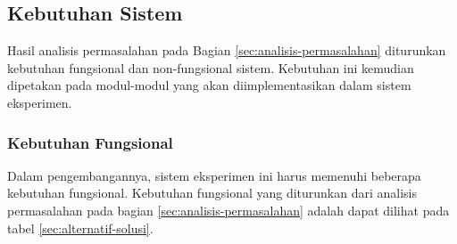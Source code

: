 \subsection{Kebutuhan Sistem}
\label{subsection:system-requirements}

Hasil analisis permasalahan pada Bagian \ref{sec:analisis-permasalahan} diturunkan kebutuhan fungsional dan non-fungsional sistem. Kebutuhan ini kemudian dipetakan pada modul-modul yang akan diimplementasikan dalam sistem eksperimen.

\subsubsection{Kebutuhan Fungsional}
\label{subsection:functional-requirements}

Dalam pengembangannya, sistem eksperimen ini harus memenuhi beberapa kebutuhan fungsional. Kebutuhan fungsional yang diturunkan dari analisis permasalahan pada bagian \ref{sec:analisis-permasalahan} adalah dapat dilihat pada tabel \ref{sec:alternatif-solusi}.

